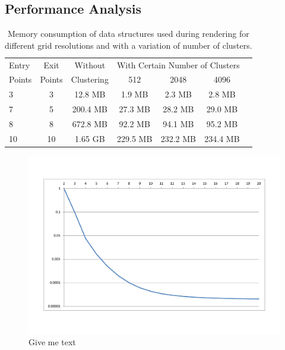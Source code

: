 \documentclass[journal]{vgtc}                %
\begin{document}
\subsection{Performance Analysis}\label{subsec:performance}

\begin{table}[b]
  \caption{Memory consumption of data structures used during rendering for different grid resolutions and with a variation of number of clusters.}
  \label{tab:data_size}
  \begin{center}
    \begin{tabular}{|l|c|c|c|c|c|c|}
      \hline
      Entry & Exit &  Without & \multicolumn{3}{c|}{With Certain Number of Clusters}\\
      Points & Points & Clustering & 512 & 2048 & 4096\\
      \hline
      3 & 3 & 12.8 MB & 1.9 MB & 2.3 MB & 2.8 MB \\
      7 & 5 & 200.4 MB & 27.3 MB & 28.2 MB & 29.0 MB\\
      8 & 8 & 672.8 MB & 92.2 MB & 94.1 MB & 95.2 MB \\
      10 & 10 & 1.65 GB & 229.5 MB & 232.2 MB & 234.4 MB \\
      \hline
    \end{tabular}
  \end{center}
\end{table}

\begin{figure}[t]
    \centering 
		\includegraphics[width=1.0\linewidth]{figures/spline_control_points_error}
    \caption{Give me text}
    \label{fig:spline_control_points_error}
\end{figure}
\end{document}
